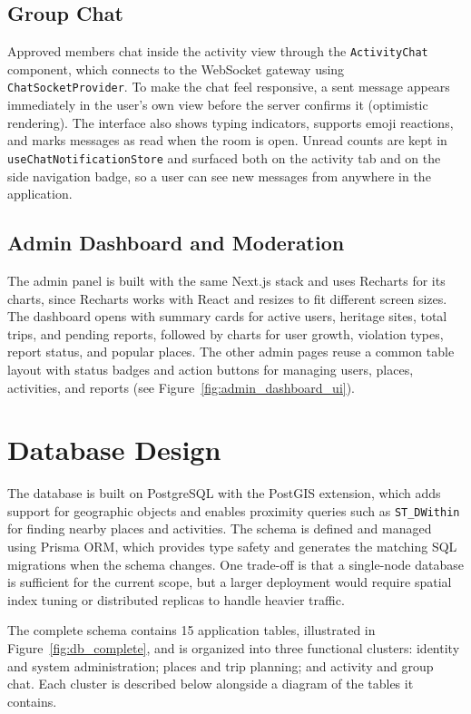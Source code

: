 \documentclass[a4paper,12pt]{report}
\begin{document}
\subsection{Group Chat}

Approved members chat inside the activity view through the \texttt{ActivityChat} component, which connects to the WebSocket gateway using \texttt{ChatSocketProvider}. To make the chat feel responsive, a sent message appears immediately in the user's own view before the server confirms it (optimistic rendering). The interface also shows typing indicators, supports emoji reactions, and marks messages as read when the room is open. Unread counts are kept in \texttt{useChatNotificationStore} and surfaced both on the activity tab and on the side navigation badge, so a user can see new messages from anywhere in the application.

\subsection{Admin Dashboard and Moderation}

The admin panel is built with the same Next.js stack and uses Recharts for its charts, since Recharts works with React and resizes to fit different screen sizes. The dashboard opens with summary cards for active users, heritage sites, total trips, and pending reports, followed by charts for user growth, violation types, report status, and popular places. The other admin pages reuse a common table layout with status badges and action buttons for managing users, places, activities, and reports (see Figure~\ref{fig:admin_dashboard_ui}).

\section{Database Design}

The database is built on PostgreSQL with the PostGIS extension, which adds support for geographic objects and enables proximity queries such as \texttt{ST\_DWithin} for finding nearby places and activities. The schema is defined and managed using Prisma ORM, which provides type safety and generates the matching SQL migrations when the schema changes. One trade-off is that a single-node database is sufficient for the current scope, but a larger deployment would require spatial index tuning or distributed replicas to handle heavier traffic.

The complete schema contains 15 application tables, illustrated in Figure~\ref{fig:db_complete}, and is organized into three functional clusters: identity and system administration; places and trip planning; and activity and group chat. Each cluster is described below alongside a diagram of the tables it contains.
\end{document}
